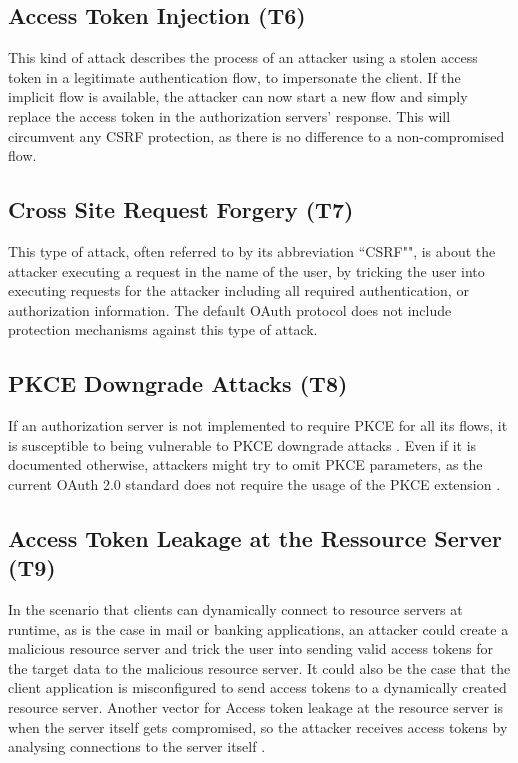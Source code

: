 \documentclass[
    fontsize=12pt,
    headings=small,
    parskip=half,           %
    bibliography=totoc,
    numbers=noenddot,       %
    open=any,               %
    ]{scrreprt}
\begin{document}
\subsection[Access Token Injection]{Access Token Injection (T6)}
\label{threat:T6}
This kind of attack describes the process of an attacker using a stolen access
token in a legitimate authentication flow, to impersonate the client. If the
implicit flow is available, the attacker can now start a new flow and simply
replace the access token in the authorization servers' response. This will
circumvent any CSRF protection, as there is no difference to a non-compromised
flow. \cite{lodderstedt2020oauth}


\subsection[Cross Site Request Forgery]{Cross Site Request Forgery (T7)}
\label{threat:T7}
This type of attack, often referred to by its abbreviation ``CSRF"", is about
the attacker executing a request in the name of the user, by tricking the user
into executing requests for the attacker including all required authentication,
or authorization information. The default OAuth protocol does not include
protection mechanisms against this type of attack. 

\subsection[PKCE Downgrade Attacks]{PKCE Downgrade Attacks (T8)}
\label{threat:T8}
If an authorization server is not implemented to require PKCE for all its
flows, it is susceptible to being vulnerable to PKCE downgrade attacks
\cite{philippaerts2022oauch}. Even if it is documented otherwise, attackers
might try to omit PKCE parameters, as the current OAuth 2.0 standard does not
require the usage of the PKCE extension \cite{hardt2012rfc}. 


\subsection[Access Token Leakage at the Ressource Server]{Access Token Leakage at the Ressource Server (T9)}
\label{threat:T9}
In the scenario that clients can dynamically connect to resource servers at runtime, as is the case in mail or banking applications, an attacker could create a malicious resource server and trick the user into sending valid access tokens for the target data to the malicious resource server. It could also be the case that the client application is misconfigured to send access tokens to a dynamically created resource server. Another vector for Access token leakage at the resource server is when the server itself gets compromised, so the attacker receives access tokens by analysing connections to the server itself \cite{lodderstedt2020oauth}.
\end{document}
